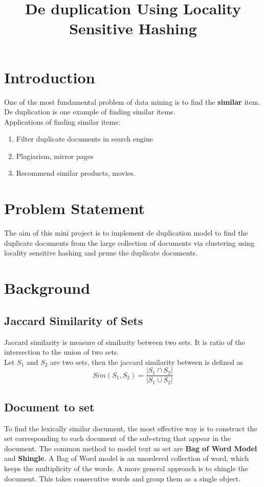 \documentclass[12pt, a4paper,twoside]{article}
\title{De duplication  Using Locality Sensitive Hashing}
\date{}
\begin{document}
\setcounter{page}{1}
\maketitle

\section*{Introduction}
\label{sec:introduction}
One of the most fundamental problem of data mining is to find the \textbf{similar} item. De duplication is one example of finding similar items.\\ 
Applications of finding  similar items:
\begin{enumerate}
\item Filter duplicate documents in search engine
\item Plagiarism, mirror pages
\item Recommend similar products, movies. 
\end{enumerate}

\section*{Problem Statement}
The aim  of this  mini project is to implement de duplication model to find the duplicate documents from the large collection of documents via clustering using locality sensitive hashing and prune the duplicate documents.


\section*{Background \cite{rajaraman2011mining} }
\subsection*{Jaccard Similarity of Sets}
Jaccard similarity is  measure of similarity between two sets. It is ratio of the intersection to  the union of two sets.\\
 Let $S_1$ and $S_2$ are two sets, then the jaccard similarity between is defined as 
$$ Sim(S_1 , S_2) = \frac{|S_1 \cap S_2|}{|S_1 \cup S_2|}$$

\subsection*{Document to set}
To find the lexically similar document, the most effective way is to construct the set corresponding to each document of the sub-string that appear in the document.
The common method to model text as set are \textbf{Bag of Word Model} and \textbf{Shingle}. A Bag of Word model is an unordered collection of word, which keeps the multiplicity of the words. A more general approach is to shingle the document. This takes consecutive words and group them as a single object.
\end{document}
